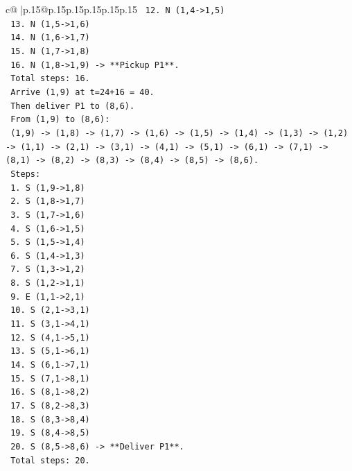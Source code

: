 \documentclass{article}
\begin{document}
{\begin{supertabular}{c@{$\;$}|p{.15\linewidth}@{}p{.15\linewidth}p{.15\linewidth}p{.15\linewidth}p{.15\linewidth}p{.15\linewidth}}
{{{\texttt{    12. N (1,4{-}>1,5)} \\
\texttt{    13. N (1,5{-}>1,6)} \\
\texttt{    14. N (1,6{-}>1,7)} \\
\texttt{    15. N (1,7{-}>1,8)} \\
\texttt{    16. N (1,8{-}>1,9) {-}> **Pickup P1**.} \\
\texttt{    Total steps: 16.} \\
\texttt{    Arrive (1,9) at t=24+16 = 40.} \\
\texttt{    Then deliver P1 to (8,6).} \\
\texttt{    From (1,9) to (8,6):} \\
\texttt{    (1,9) {-}> (1,8) {-}> (1,7) {-}> (1,6) {-}> (1,5) {-}> (1,4) {-}> (1,3) {-}> (1,2) {-}> (1,1) {-}> (2,1) {-}> (3,1) {-}> (4,1) {-}> (5,1) {-}> (6,1) {-}> (7,1) {-}> (8,1) {-}> (8,2) {-}> (8,3) {-}> (8,4) {-}> (8,5) {-}> (8,6).} \\
\texttt{    Steps:} \\
\texttt{    1. S (1,9{-}>1,8)} \\
\texttt{    2. S (1,8{-}>1,7)} \\
\texttt{    3. S (1,7{-}>1,6)} \\
\texttt{    4. S (1,6{-}>1,5)} \\
\texttt{    5. S (1,5{-}>1,4)} \\
\texttt{    6. S (1,4{-}>1,3)} \\
\texttt{    7. S (1,3{-}>1,2)} \\
\texttt{    8. S (1,2{-}>1,1)} \\
\texttt{    9. E (1,1{-}>2,1)} \\
\texttt{    10. S (2,1{-}>3,1)} \\
\texttt{    11. S (3,1{-}>4,1)} \\
\texttt{    12. S (4,1{-}>5,1)} \\
\texttt{    13. S (5,1{-}>6,1)} \\
\texttt{    14. S (6,1{-}>7,1)} \\
\texttt{    15. S (7,1{-}>8,1)} \\
\texttt{    16. S (8,1{-}>8,2)} \\
\texttt{    17. S (8,2{-}>8,3)} \\
\texttt{    18. S (8,3{-}>8,4)} \\
\texttt{    19. S (8,4{-}>8,5)} \\
\texttt{    20. S (8,5{-}>8,6) {-}> **Deliver P1**.} \\
\texttt{    Total steps: 20.} \\
}}}
\end{supertabular}}
\end{document}
